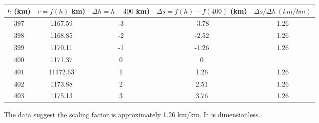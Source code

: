\documentclass{ximera}
\begin{document}
\begin{question}
\begin{explanation}
\item 

\begin{center}
  \begin{tabular}{ | c| c | c | c | c |}
    \hline
    $h$ (km) & $r = f(h)$ km) & $\Delta h = h-400$ km)  & $\Delta s =f(h) - f(400)$ (km) & $\Delta s/\Delta h \, (km/km)$ \\ \hline
     $397$ & 1167.59  & -3 & -3.78  & 1.26\\ \hline
    $398$ & 1168.85  & -2 & -2.52  & 1.26 \\ \hline
    $399$ & 1170.11 & -1 & -1.26  & 1.26 \\ \hline
    $400$  & 1171.37 & 0&  0 &   \\ \hline
    $401$ & 11172.63 & 1  & 1.26  &  1.26 \\ \hline
    $402$ & 1173.88 & 2 & 2.51 & 1.26 \\ \hline
    $403$ & 1175.13 & 3 &  3.76 & 1.26 \\ \hline
    \hline
  \end{tabular}
\end{center}

The data suggest the scaling factor is approximately 1.26 km/km. It is dimensionless.

\end{explanation}
\end{question}
\end{document}
